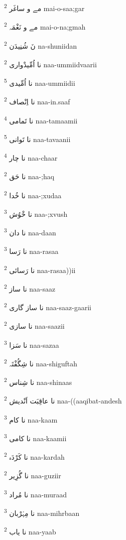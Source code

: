 \documentclass[12pt]{article}
\begin{document}
\begin{RTL}
\begin{multicols}{5}
{\ur مے و ساغَر}   \textsuperscript{2} mai-o-saa;gar

{\ur مے و نَغْمَہ}   \textsuperscript{2} mai-o-na;gmah

{\ur نَ شُنِیدَن}   \textsuperscript{2} na-shuniidan

{\ur نا اُمِّیدْواری}   \textsuperscript{2} naa-ummiidvaarii

{\ur نا اُمِّیدی}   \textsuperscript{5} naa-ummiidii

{\ur نا اِنْصاف}   \textsuperscript{2} naa-in.saaf

{\ur نا تَمامی}   \textsuperscript{4} naa-tamaamii

{\ur نا تَوانی}   \textsuperscript{5} naa-tavaanii

{\ur نا چار}   \textsuperscript{4} naa-chaar

{\ur نا حَق}   \textsuperscript{2} naa-;haq

{\ur نا خُدا}   \textsuperscript{2} naa-;xudaa

{\ur نا خْوُش}   \textsuperscript{3} naa-;xvush

{\ur نا دان}   \textsuperscript{3} naa-daan

{\ur نا رَسا}   \textsuperscript{3} naa-rasaa

{\ur نا رَسائی}   \textsuperscript{2} naa-rasaa))ii

{\ur نا ساز}   \textsuperscript{2} naa-saaz

{\ur نا ساز گاری}   \textsuperscript{2} naa-saaz-gaarii

{\ur نا سازی}   \textsuperscript{2} naa-saazii

{\ur نا سَزا}   \textsuperscript{3} naa-sazaa

{\ur نا شِگُفْتَہ}   \textsuperscript{2} naa-shiguftah

{\ur نا شِناس}   \textsuperscript{2} naa-shinaas

{\ur نا عاقِبَت اَنْدیش}   \textsuperscript{2} naa-((aaqibat-andesh

{\ur نا کام}   \textsuperscript{3} naa-kaam

{\ur نا کامی}   \textsuperscript{3} naa-kaamii

{\ur نا کَرْدَہ}   \textsuperscript{2} naa-kardah

{\ur نا گُزِیر}   \textsuperscript{2} naa-guziir

{\ur نا مُراد}   \textsuperscript{3} naa-muraad

{\ur نا مِہْرْبان}   \textsuperscript{3} naa-mihrbaan

{\ur نا یاب}   \textsuperscript{2} naa-yaab


\end{multicols}
\end{RTL}
\end{document}

